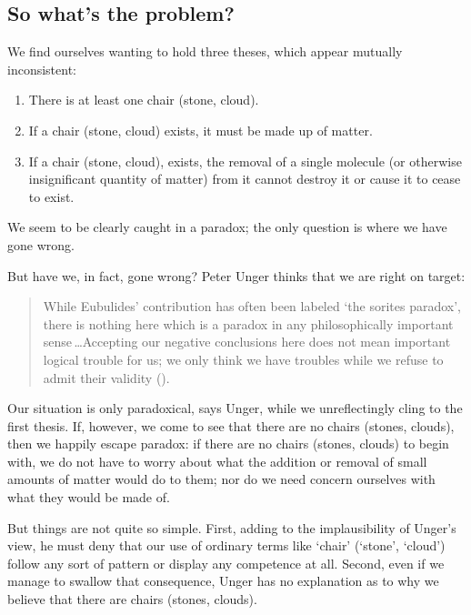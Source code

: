 \documentclass[11pt]{article}
\newenvironment{squote}{%
	\begin{quote}\begin{singlespace}%
	}{%
	\end{singlespace}\end{quote}}
\begin{document}
\begin{spacing}{1.5}
\subsection{So what's the problem?}
We find ourselves wanting to hold three theses, which appear mutually
inconsistent:

\begin{enumerate}
  \item There is at least one chair (stone, cloud).
  \item If a chair (stone, cloud) exists, it must be made up of
    matter.
  \item If a chair (stone, cloud), exists, the removal of a single
    molecule (or otherwise insignificant quantity of matter) from it
    cannot destroy it or cause it to cease to exist.
\end{enumerate}

We seem to be clearly caught in a paradox; the only question is where
we have gone wrong.

But have we, in fact, gone wrong?  Peter Unger thinks that we are
right on target:

\begin{squote}
While Eubulides' contribution has often been labeled `the sorites
paradox', there is nothing here which is a paradox in any
philosophically important sense\,\ldots Accepting our negative
conclusions here does not mean important logical trouble for us; we
only think we have troubles while we refuse to admit their validity
(\citeyear[145]{unger1979}).
\end{squote}

Our situation is only paradoxical, says Unger, while we unreflectingly
cling to the first thesis.  If, however, we come to see that there are
no chairs (stones, clouds), then we happily escape paradox: if there
are no chairs (stones, clouds) to begin with, we do not have to worry
about what the addition or removal of small amounts of matter would do
to them; nor do we need concern ourselves with what they would be made
of.

But things are not quite so simple.  First, adding to the
implausibility of Unger's view, he must deny that our use of ordinary
terms like `chair' (`stone', `cloud') follow any sort of pattern or
display any competence at all.  Second, even if we manage to swallow
that consequence, Unger has no explanation as to why we believe that
there are chairs (stones, clouds).


\end{spacing}
\end{document}

